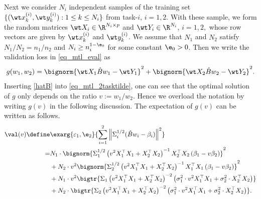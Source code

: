 Next we consider $N_i$ independent samples of the training set $\{(\wt x_k^{(i)},\wt y_k^{(i)}): 1\le k \le N_i\}$ from task-$i$, $i=1,2$. With these sample, we form the random matrices $\wt X_i \in \R^{N_i\times p}$ and $\wt Y_i\in \R^{N_i}$, $i=1,2,$ whose row vectors are given by $\wt x_k^{(i)}$ and $\wt y_k^{(i)}$. We assume that $N_1$ and $N_2$ satisfy $N_1/N_2=n_1/n_2$ and $N_i \ge n_i^{1-\e_0}$ for some constant $\e_0>0$. Then we write the validation loss in \eqref{eq_mtl_eval} as
\begin{align}\label{eq_mtl_2tasktilde}
	g(w_1,w_2) = \bignorm{\wt X_1 \hat B w_1 - \wt Y_1}^2 + \bignorm{\wt X_2 \hat B w_2 - \wt Y_2}^2.
\end{align}
Inserting \eqref{hatB} into \eqref{eq_mtl_2tasktilde}, one can see that the optimal solution of $g$ only depends on the ratio $v:=w_1/w_2$.
Hence we overload the notation by writing $g(v)$ in the following discussion.
The expectation of $g(v)$ can be written as follows.
\begin{align}
		\val(v) \define& \exarg{\varepsilon_1,\e_2} {\sum_{i=1}^2 \left\|\Sigma_i^{1/2}( \hat B w_i - \beta_i) \right\|^2} \nonumber\\
	=&  N_1 \cdot \bignorm{\Sigma_1^{1/2}\left(v^2 X_1^{\top}X_1 + X_2^{\top}X_2\right)^{-1}X_2^{\top}X_2\left (\beta_1 - v\beta_2\right)}^2 \nonumber \\
	&+ N_2 \cdot v^2\bignorm{\Sigma_2^{1/2}\left(v^2 X_1^{\top}X_1 + X_2^{\top}X_2\right)^{-1}X_1^{\top}X_1\left(\beta_1 - v\beta_2\right)}^2 \nonumber \\
		&+ N_1   \cdot v^2 \bigtr{\Sigma_1\left(v^2 X_1^{\top}X_1 + X_2^{\top}X_2\right)^{-2} \left(\sigma_1^2 \cdot v^2X_1^{\top}X_1 + \sigma_2^2 \cdot X_2^{\top}X_2\right)} \nonumber \\
		&+ N_2  \cdot \bigtr{\Sigma_2\left(v^2 X_1^{\top}X_1 + X_2^{\top}X_2\right)^{-2} \left(\sigma_1^2 \cdot v^2  X_1^{\top}X_1 + \sigma_2^2  \cdot X_2^{\top}X_2\right)}. \label{revise_eq_val_mtl}
\end{align}

